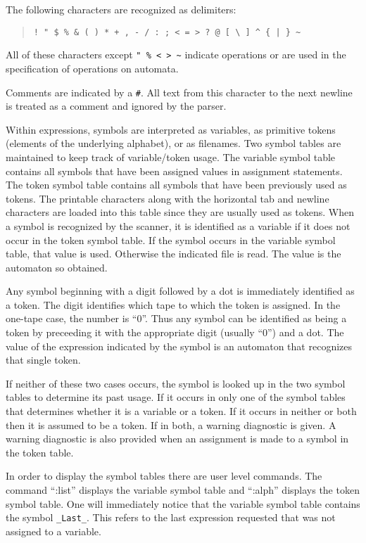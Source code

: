 The following characters are recognized as delimiters:
\begin{quote}
\begin{verbatim}
! " $ % & ( ) * + , - / : ; < = > ? @ [ \ ] ^ { | } ~
\end{verbatim}
\end{quote}
All of these characters except \verb#" % < > ~# indicate operations or are
used in the specification of operations on automata.

Comments are indicated by a \verb$#$.
All text from this character to the next newline is treated as a comment
and ignored by the parser.

Within expressions, symbols are interpreted as variables, as
primitive tokens (elements of the underlying alphabet), or as filenames.
Two symbol tables are maintained to keep track of variable/token usage.
The variable symbol table contains all symbols that have been assigned
values in assignment statements.
The token symbol table contains all symbols that have been previously used
as tokens.
The printable characters along with the horizontal tab and newline
characters are loaded into this table since they are usually used as tokens.
When a symbol is recognized by the scanner, it is identified as a variable
if it does not occur in the token symbol table.
If the symbol occurs in the variable symbol table, that value is used.
Otherwise the indicated file is read.
The value is the automaton so obtained.

Any symbol beginning with a digit followed by a dot is immediately
identified as a token.
The digit identifies which tape to which the token is assigned.
In the one-tape case, the number is ``0''.
Thus any symbol can be identified as being a token by preceeding it with
the appropriate digit (usually ``0'') and a dot.
The value of the expression indicated by the symbol is an automaton that
recognizes that single token.

If neither of these two cases occurs, the symbol is looked up in the two
symbol tables to determine its past usage.
If it occurs in only one of the symbol tables that determines whether it is
a variable or a token.
If it occurs in neither or both then it is assumed to be a token.
If in both, a warning diagnostic is given.
A warning diagnostic is also provided when an assignment is made to a
symbol in the token table.

In order to display the symbol tables there are user level commands.
The command ``:list'' displays the variable symbol table and ``:alph''
displays the token symbol table.
One will immediately notice that the variable symbol table contains the
symbol \verb#_Last_#.
This refers to the last expression requested that was not assigned to a
variable.

